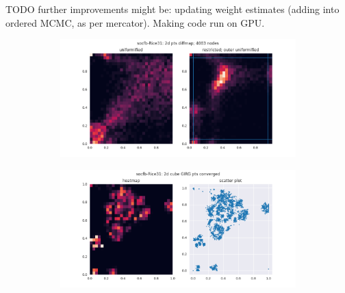 TODO further improvements might be: updating weight estimates (adding into ordered MCMC, as per mercator). Making code run on GPU.


\begin{figure}
  \caption{2d cube GIRG fitting examples: Two diffusion map embeddings with different post-processing methods The blue lines for the restricted version show the border at which points are outer uniformified. Then heat map / scatter plot for further refined point locations using direct ordered likelihood maximisation.}
  \label{fig:uniformifed_vs_restricted_rescaling}
  \centering

  \begin{subfigure}{\textwidth}
    \centering
    \includegraphics[width=\linewidth]{figures/socfb-Rice31_2ddiffmap_unif_vs_restrict.png}
  \end{subfigure}

  \vspace{1em}
  \begin{subfigure}{\textwidth}
    \centering
    \includegraphics[width=\linewidth]{figures/socfb-Rice31_2d_cube_GIRG_converged.png}
  \end{subfigure}

  \vspace{1em}
  
\end{figure}
